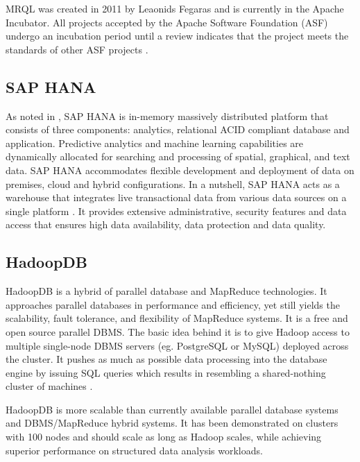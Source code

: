      MRQL was created in 2011 by Leaonids
     Fegaras \cite{www-mrqlhadoop} and is currently in the Apache
     Incubator.  All projects accepted by the Apache Software
     Foundation (ASF) undergo an incubation period until a review
     indicates that the project meets the standards of other ASF
     projects \cite{www-apacheincubator}.

\subsection{SAP HANA}

     As noted in \cite{www-sap-hana}, SAP HANA is in-memory massively
     distributed platform that consists of three components:
     analytics, relational ACID compliant database and
     application. Predictive analytics and machine learning
     capabilities are dynamically allocated for searching and
     processing of spatial, graphical, and text data. 
     SAP HANA accommodates flexible development and deployment of 
     data on premises, cloud and hybrid configurations.  In a 
     nutshell, SAP HANA acts as a warehouse that integrates live 
     transactional data from various data sources on a single 
     platform \cite{olofson-2014}. It provides extensive 
     administrative, security features and data access that ensures 
     high data availability, data protection and data quality.
	 

\subsection{HadoopDB}
    
     HadoopDB is a hybrid of parallel database and MapReduce
     technologies. It approaches parallel databases in performance and
     efficiency, yet still yields the scalability, fault tolerance,
     and flexibility of MapReduce systems. It is a free and open
     source parallel DBMS. The basic idea behind it is to give Hadoop
     access to multiple single-node DBMS servers (eg. PostgreSQL or
     MySQL) deployed across the cluster. It pushes as much as possible
     data processing into the database engine by issuing SQL queries
     which results in resembling a shared-nothing cluster of
     machines \cite{www-hadoopdb}.

     HadoopDB is more scalable than currently available parallel
     database systems and DBMS/MapReduce hybrid systems. It has been
     demonstrated on clusters with 100 nodes and should scale as long
     as Hadoop scales, while achieving superior performance on
     structured data analysis workloads.
     
